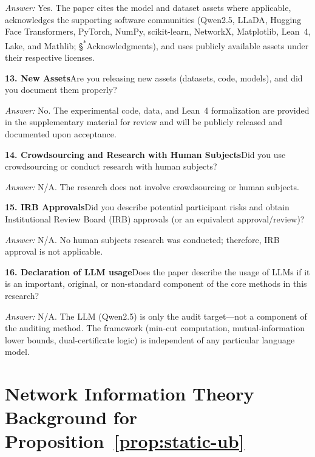 \documentclass{article}
\begin{document}
\emph{Answer:} Yes. The paper cites the model and dataset assets where applicable, acknowledges the supporting software communities (Qwen2.5, LLaDA, Hugging Face Transformers, PyTorch, NumPy, scikit-learn, NetworkX, Matplotlib, Lean~4, Lake, and Mathlib; \S\textsuperscript{*}Acknowledgments), and uses publicly available assets under their respective licenses.

\noindent\textbf{13. New Assets}\quad Are you releasing new assets (datasets, code, models), and did you document them properly?

\emph{Answer:} No. The experimental code, data, and Lean~4 formalization are provided in the supplementary material for review and will be publicly released and documented upon acceptance.

\noindent\textbf{14. Crowdsourcing and Research with Human Subjects}\quad Did you use crowdsourcing or conduct research with human subjects?

\emph{Answer:} N/A. The research does not involve crowdsourcing or human subjects.

\noindent\textbf{15. IRB Approvals}\quad Did you describe potential participant risks and obtain Institutional Review Board (IRB) approvals (or an equivalent approval/review)?

\emph{Answer:} N/A. No human subjects research was conducted; therefore, IRB approval is not applicable.

\noindent\textbf{16. Declaration of LLM usage}\quad Does the paper describe the usage of LLMs if it is an important, original, or non-standard component of the core methods in this research?

\emph{Answer:} N/A. The LLM (Qwen2.5) is only the audit target---not a component of the auditing method. The framework (min-cut computation, mutual-information lower bounds, dual-certificate logic) is independent of any particular language model.

\newpage

\appendix

\section{Network Information Theory Background for Proposition~\ref{prop:static-ub}}
\label{app:netinfo}
\end{document}
